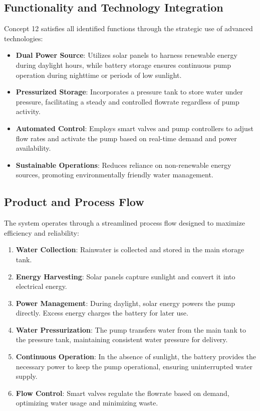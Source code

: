 \documentclass[12pt]{article}
\begin{document}
\subsection{Functionality and Technology Integration}

Concept 12 satisfies all identified functions through the strategic use of advanced technologies:

\begin{itemize}
    \item \textbf{Dual Power Source}: Utilizes solar panels to harness renewable energy during daylight hours, while battery storage ensures continuous pump operation during nighttime or periods of low sunlight.
    \item \textbf{Pressurized Storage}: Incorporates a pressure tank to store water under pressure, facilitating a steady and controlled flowrate regardless of pump activity.
    \item \textbf{Automated Control}: Employs smart valves and pump controllers to adjust flow rates and activate the pump based on real-time demand and power availability.
    \item \textbf{Sustainable Operations}: Reduces reliance on non-renewable energy sources, promoting environmentally friendly water management.
\end{itemize}

\subsection{Product and Process Flow}

The system operates through a streamlined process flow designed to maximize efficiency and reliability:

\begin{enumerate}
    \item \textbf{Water Collection}: Rainwater is collected and stored in the main storage tank.
    \item \textbf{Energy Harvesting}: Solar panels capture sunlight and convert it into electrical energy.
    \item \textbf{Power Management}: During daylight, solar energy powers the pump directly. Excess energy charges the battery for later use.
    \item \textbf{Water Pressurization}: The pump transfers water from the main tank to the pressure tank, maintaining consistent water pressure for delivery.
    \item \textbf{Continuous Operation}: In the absence of sunlight, the battery provides the necessary power to keep the pump operational, ensuring uninterrupted water supply.
    \item \textbf{Flow Control}: Smart valves regulate the flowrate based on demand, optimizing water usage and minimizing waste.
\end{enumerate}
\end{document}

